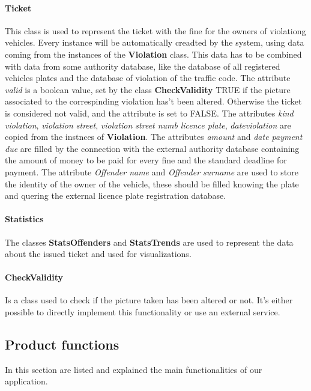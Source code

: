 \paragraph{Ticket}
This class is used to represent the ticket with the fine for the owners of violationg vehicles. Every instance will be automatically creadted by the system, using data coming from the instances of the \textbf{Violation} class. This data has to be combined with data from some authority database, like the database of all registered vehicles plates and the database of violation of the traffic code.
The attribute \textit{valid} is a boolean value, set by the class \textbf{CheckValidity} TRUE if the picture associated to the correspinding violation has't been altered. Otherwise the ticket is considered not valid, and the attribute is set to FALSE.
The attributes \textit{kind violation}, \textit{violation street}, \textit{violation street numb} \textit{licence plate}, \textit{dateviolation} are copied from the instnces of \textbf{Violation}.
The attributes \textit{amount} and \textit{date payment due} are filled by the connection with the external authority database containing the amount of money to be paid for every fine and the standard deadline for payment.
The attribute \textit{Offender name} and \textit{Offender surname} are used to store the identity of the owner of the vehicle, these should be filled knowing the plate and quering the external licence plate registration database.

\paragraph{Statistics}
The classes \textbf{StatsOffenders} and \textbf{StatsTrends} are used to represent the data about the issued ticket and used for visualizations.

\paragraph{CheckValidity}
Is a class used to check if the picture taken has been altered or not. It's either possible to directly implement this functionality or use an external service.


\subsection{Product functions}
In this section are listed and explained the main functionalities of our application.

